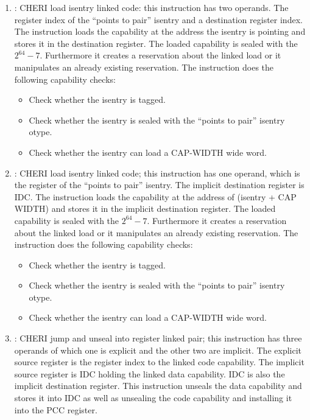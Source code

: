 \begin{enumerate}
  \item {}: CHERI load isentry linked code: this instruction has two operands. The register index of the ``points to pair'' isentry and a destination register index.
  The instruction loads the capability at the address the isentry is pointing and stores it in the destination register.
  The loaded capability is sealed with the \cotype{} $2^{64} - 7$.
  Furthermore it creates a reservation about the linked load or it manipulates an already existing reservation.
  The instruction does the following capability checks:
  \begin{itemize}
    \item Check whether the isentry is tagged.
    \item Check whether the isentry is sealed with the ``points to pair'' isentry otype.
    \item Check whether the isentry can load a CAP-WIDTH wide word.
  \end{itemize}
  \item {}: CHERI load isentry linked code; this instruction has one operand, which is the register of the ``points to pair'' isentry.
  The implicit destination register is IDC.
  The instruction loads the capability at the address of (isentry + CAP WIDTH) and stores it in the implicit destination register.
  The loaded capability is sealed with the \cotype{} $2^{64} - 7$.
  Furthermore it creates a reservation about the linked load or it manipulates an already existing reservation.
  The instruction does the following capability checks:
  \begin{itemize}
    \item Check whether the isentry is tagged.
    \item Check whether the isentry is sealed with the ``points to pair'' isentry otype.
    \item Check whether the isentry can load a CAP-WIDTH wide word.
  \end{itemize}
  \item {}: CHERI jump and unseal into register linked pair; this instruction has three operands of which one is explicit and the other two are implicit.
  The explicit source register is the register index to the linked code capability.
  The implicit source register is IDC holding the linked data capability.
  IDC is also the implicit destination register.
  This instruction unseals the data capability and stores it into IDC as well as unsealing the code capability and installing it into the PCC register.

\end{enumerate}
